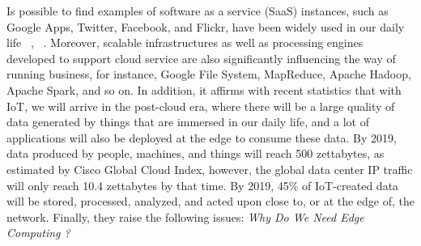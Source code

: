 Is possible to find examples of software as a service (SaaS) instances, such as Google Apps, Twitter, Facebook, and Flickr, have been widely used in our daily life ~\cite{vision_challenges_edge}, ~\cite{promise_edge}. Moreover, scalable infrastructures as well as processing engines developed to support cloud service are also significantly influencing the way of running business, for instance, Google File System, MapReduce, Apache Hadoop, Apache Spark, and so on. In addition, it affirms with recent statistics that with IoT, we will arrive in the post-cloud era, where there will be a large quality of data generated by things that are immersed in our daily life, and a lot of applications will also be deployed at the edge to consume these data. By 2019, data produced by people, machines, and things will reach 500 zettabytes, as estimated by Cisco Global Cloud Index, however, the global data center IP traffic will only reach 10.4 zettabytes by that time. By 2019, 45\% of IoT-created data will be stored, processed, analyzed, and acted upon close to, or at the edge of, the network. Finally, they raise the following issues: \textit{Why Do We Need Edge Computing ?}

